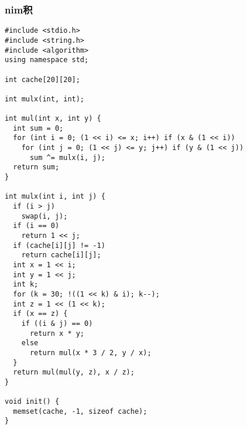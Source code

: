 \subsubsection{nim积}
\begin{verbatim}
#include <stdio.h>
#include <string.h>
#include <algorithm>
using namespace std;

int cache[20][20];

int mulx(int, int);

int mul(int x, int y) {
  int sum = 0;
  for (int i = 0; (1 << i) <= x; i++) if (x & (1 << i))
    for (int j = 0; (1 << j) <= y; j++) if (y & (1 << j))
      sum ^= mulx(i, j);
  return sum;
}

int mulx(int i, int j) {
  if (i > j)
    swap(i, j);
  if (i == 0)
    return 1 << j;
  if (cache[i][j] != -1)
    return cache[i][j];
  int x = 1 << i;
  int y = 1 << j;
  int k;
  for (k = 30; !((1 << k) & i); k--);
  int z = 1 << (1 << k);
  if (x == z) {
    if ((i & j) == 0)
      return x * y;
    else
      return mul(x * 3 / 2, y / x);
  }
  return mul(mul(y, z), x / z);
}

void init() {
  memset(cache, -1, sizeof cache);
}
\end{verbatim}

